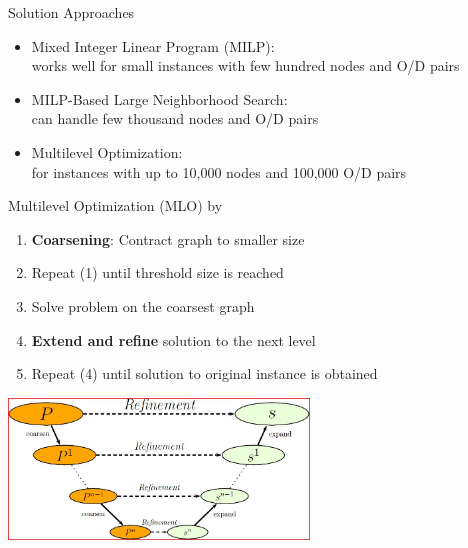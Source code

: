 \documentclass[aspectratio=1610]{beamer}
\newcommand{\important}[1]{{\color{green!60!black}#1}}
\begin{document}
\begin{frame}{Solution Approaches}
	\begin{itemize}
		\itemsep3ex
		\item \important{Mixed Integer Linear Program (MILP)}:\\ works well for small instances with \alert{few hundred} nodes and O/D pairs
		\item \important{MILP-Based Large Neighborhood Search}:\\ can handle \alert{few thousand} nodes and O/D pairs
		\item \important{Multilevel Optimization}:\\ for instances with \alert{up to 10,000 nodes and 100,000 O/D pairs}
	\end{itemize}
\end{frame}


\begin{frame}{Multilevel Optimization (MLO) by \citet{walshaw-04}}

	\begin{enumerate}
		\item \important{\bf Coarsening}: Contract graph to smaller size
		\item Repeat (1) until threshold size is reached
		\item Solve problem on the coarsest graph
		\item \important{\bf Extend and refine} solution to the next level
		\item Repeat (4) until solution to original instance is obtained
	\end{enumerate}

	\bigskip
	\begin{center}
		\includegraphics[width=0.6\textwidth]{graphics/multilevel.jpg}\\
	\end{center}
\end{frame}
\end{document}
